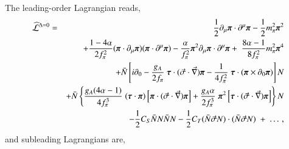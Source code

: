 \documentclass[sort&compress,preprint,3p]{elsarticle}
\begin{document}
The leading-order Lagrangian reads,
\begin{eqnarray}
\widehat{\cal L}^{\Delta=0} &=&
	\frac{1}{2} 
	\partial_\mu \mbox{\boldmath{$\pi$}} \cdot 
	\partial^\mu \mbox{\boldmath{$\pi$}}
     -  \frac{1}{2} m_\pi^2 \mbox{\boldmath{$\pi$}}^2
\nonumber \\ &&
     +  \frac{1-4\alpha}{2f_\pi^2} 
        (\mbox{\boldmath{$\pi$}} \cdot \partial_\mu \mbox{\boldmath{$\pi$}})
        (\mbox{\boldmath{$\pi$}} \cdot \partial^\mu \mbox{\boldmath{$\pi$}})
     -  \frac{\alpha}{f_\pi^2} 
        \mbox{\boldmath{$\pi$}}^2
	\partial_\mu \mbox{\boldmath{$\pi$}} \cdot 
	\partial^\mu \mbox{\boldmath{$\pi$}}
     +\;  \frac{8\alpha-1}{8f_\pi^2} 
        m_\pi^2 \mbox{\boldmath{$\pi$}}^4
\nonumber \\ &&
+ \bar{N} \left[ 
i \partial_0 
- \frac{g_A}{2f_\pi} \; \mbox{\boldmath $\tau$} \cdot 
 ( \vec \sigma \cdot \vec \nabla ) \mbox{\boldmath $\pi$} 
- \frac{1}{4f_\pi^2} \; \mbox{\boldmath $\tau$} \cdot 
 ( \mbox{\boldmath $\pi$}
\times \partial_0 \mbox{\boldmath $\pi$})
\right] N
\nonumber \\ &&
+ \bar{N} \left\{
 \frac{g_A(4\alpha-1)}{4f_\pi^3} \;
(\mbox{\boldmath $\tau$} \cdot 
\mbox{\boldmath $\pi$}) 
\left[ \mbox{\boldmath $\pi$} \cdot 
 ( \vec \sigma \cdot \vec \nabla )
\mbox{\boldmath $\pi$} \right]
+ \frac{g_A\alpha}{2f_\pi^3} \;
\mbox{\boldmath $\pi$}^2 
\left[ \mbox{\boldmath $\tau$} \cdot 
 ( \vec \sigma \cdot \vec \nabla )
\mbox{\boldmath $\pi$} 
\right]
\right\} N 
\nonumber \\ &&
-\frac{1}{2} C_S \bar{N} N \bar{N} N 
-\frac{1}{2} C_T (\bar{N} \vec \sigma N) \cdot (\bar{N} \vec \sigma N) 
\; + \; \ldots \,,
\label{eq_LD0}
\end{eqnarray}
and subleading Lagrangians are,
\end{document}
